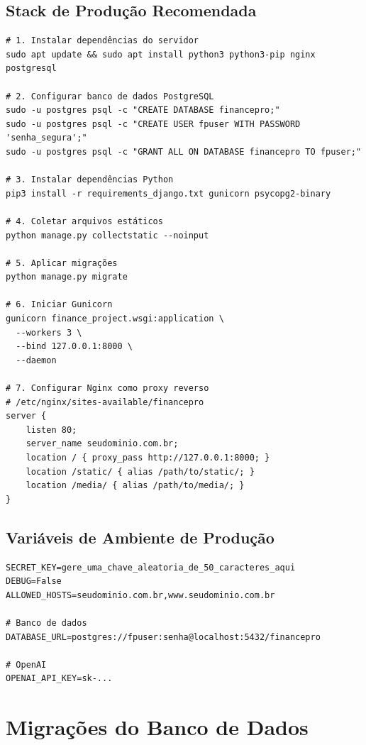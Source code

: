 \documentclass[12pt, a4paper, oneside]{report}
\begin{document}
\section{Stack de Produção Recomendada}

\begin{lstlisting}[style=bash, caption={Deploy com Gunicorn + Nginx}]
# 1. Instalar dependências do servidor
sudo apt update && sudo apt install python3 python3-pip nginx postgresql

# 2. Configurar banco de dados PostgreSQL
sudo -u postgres psql -c "CREATE DATABASE financepro;"
sudo -u postgres psql -c "CREATE USER fpuser WITH PASSWORD 'senha_segura';"
sudo -u postgres psql -c "GRANT ALL ON DATABASE financepro TO fpuser;"

# 3. Instalar dependências Python
pip3 install -r requirements_django.txt gunicorn psycopg2-binary

# 4. Coletar arquivos estáticos
python manage.py collectstatic --noinput

# 5. Aplicar migrações
python manage.py migrate

# 6. Iniciar Gunicorn
gunicorn finance_project.wsgi:application \
  --workers 3 \
  --bind 127.0.0.1:8000 \
  --daemon

# 7. Configurar Nginx como proxy reverso
# /etc/nginx/sites-available/financepro
server {
    listen 80;
    server_name seudominio.com.br;
    location / { proxy_pass http://127.0.0.1:8000; }
    location /static/ { alias /path/to/static/; }
    location /media/ { alias /path/to/media/; }
}
\end{lstlisting}

\section{Variáveis de Ambiente de Produção}

\begin{lstlisting}[style=bash, caption={.env de produção (exemplo)}]
SECRET_KEY=gere_uma_chave_aleatoria_de_50_caracteres_aqui
DEBUG=False
ALLOWED_HOSTS=seudominio.com.br,www.seudominio.com.br

# Banco de dados
DATABASE_URL=postgres://fpuser:senha@localhost:5432/financepro

# OpenAI
OPENAI_API_KEY=sk-...
\end{lstlisting}

\chapter{Migrações do Banco de Dados}
\end{document}

